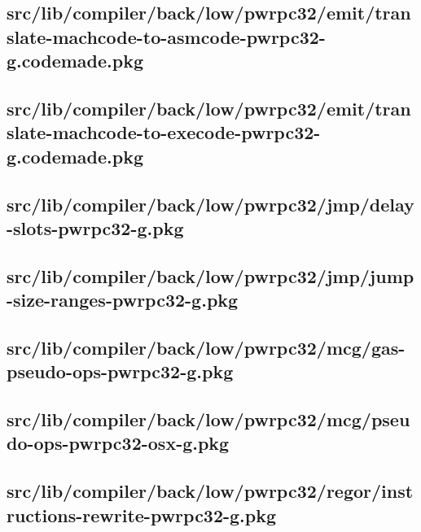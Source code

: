 \subsection{src/lib/compiler/back/low/pwrpc32/emit/translate-machcode-to-asmcode-pwrpc32-g.codemade.pkg}


\subsection{src/lib/compiler/back/low/pwrpc32/emit/translate-machcode-to-execode-pwrpc32-g.codemade.pkg}


\subsection{src/lib/compiler/back/low/pwrpc32/jmp/delay-slots-pwrpc32-g.pkg}


\subsection{src/lib/compiler/back/low/pwrpc32/jmp/jump-size-ranges-pwrpc32-g.pkg}


\subsection{src/lib/compiler/back/low/pwrpc32/mcg/gas-pseudo-ops-pwrpc32-g.pkg}


\subsection{src/lib/compiler/back/low/pwrpc32/mcg/pseudo-ops-pwrpc32-osx-g.pkg}


\subsection{src/lib/compiler/back/low/pwrpc32/regor/instructions-rewrite-pwrpc32-g.pkg}


